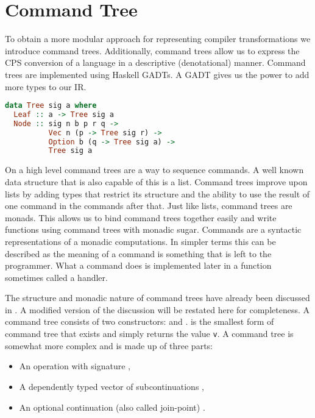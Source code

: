 
\chapter{\label{chap:commandtree}Command Tree}
To obtain a more modular approach for representing compiler transformations we introduce command trees\autocite{commandtreespoulsen}. Additionally, command trees allow us to express the \ac{CPS} conversion of a language in a descriptive (denotational) manner. Command trees are implemented using Haskell \acp{GADT}. A \ac{GADT} gives us the power to add more types to our \ac{IR}.

\begin{lstlisting}[language=Haskell]
data Tree sig a where
  Leaf :: a -> Tree sig a
  Node :: sig n b p r q ->
          Vec n (p -> Tree sig r) ->
          Option b (q -> Tree sig a) ->
          Tree sig a
\end{lstlisting}

On a high level command trees are a way to sequence commands. A well known data structure that is also capable of this is a list. Command trees improve upon lists by adding types that restrict its structure and the ability to use the result of one command in the commands after that. Just like lists, command trees are monads. This allows us to bind command trees together easily and write functions using command trees with monadic sugar. Commands are a syntactic representations of a monadic computations. In simpler terms this can be described as the meaning of a command is something that is left to the programmer. What a command does is implemented later in a function sometimes called a handler.

The structure and monadic nature of command trees have already been discussed in . A modified version of the discussion will be restated here for completeness. A command tree consists of two constructors:  and .  is the smallest form of command tree that exists and simply returns the value \lstinline{v}. A  command tree is somewhat more complex and is made up of three parts:

\begin{itemize}
\item An operation  with signature ,
\item A dependently typed vector of subcontinuations ,
\item An optional continuation (also called join-point) .
\end{itemize}

